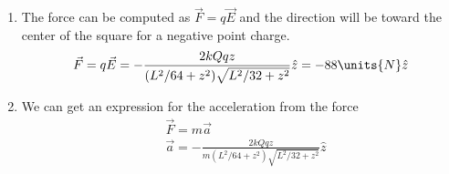 {\begin{enumerate}
\begin{align*}
        &a=\frac{L}{4},\quad\lambda=\frac{Q}{L}\\
        &E_z=\frac{\frac{1}{2}kQ z}{(L^2/64+z^2)\sqrt{L^2/32+z^2}}\\
        &\vec{E}_\text{total}=4E_z\hat{z}=\frac{2kQ z}{(L^2/64+z^2)\sqrt{L^2/32+z^2}}\hat{z}\\
    \end{align*}
    Now we can plug in the values $L=0.16\units{m}$, $Q=40\units{\mu C}$, and $z=0.2\units{m}$ to get the magnitude of the electric field.
    \begin{align*}
        &\vec{E}_\text{total}=\frac{2(8.99\times10^9\units{N\cdot m^2/C^2})(40\times10^{-6}\units{C})(0.2\units{m})}{(0.16^2\units{m^2}/64+(0.2\units{m})^2)\sqrt{(0.16^2\units{m^2}/32+(0.2\units{m})^2)}}\hat{z}=1.76\times10^7\units{N/C}\hat{z}\\
    \end{align*}
    \item The force can be computed as $\vec{F}=q\vec{E}$ and the direction will be toward the center of the square for a negative point charge.
    \begin{align*}
        &\vec{F}=q\vec{E}=-\frac{2kQq z}{(L^2/64+z^2)\sqrt{L^2/32+z^2}}\hat{z}=-88\units{N}\hat{z}\\
    \end{align*}
    \item We can get an expression for the acceleration from the force
    \begin{align*}
        &\vec{F}=m\vec{a}\\
        &\vec{a}=-\frac{2kQq z}{m(L^2/64+z^2)\sqrt{L^2/32+z^2}}\hat{z}\\
    \end{align*}
    \begin{center}
    \end{center}
\end{enumerate}
}{}
